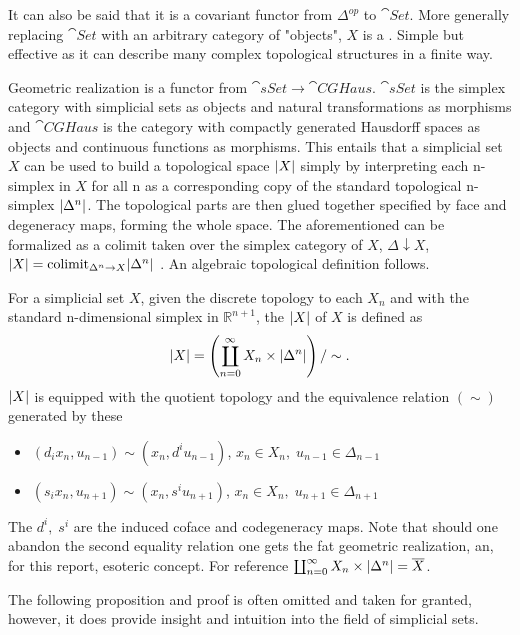 \documentclass[../../main.tex]{subfiles}
\begin{document}
    It can also be said that it is a covariant functor from $\Delta^{op}$ to $\cat{Set}$. More generally replacing $\cat{Set}$ with an arbitrary category of "objects", $X$ is a . Simple but effective as it can describe many complex topological structures in a finite way.
    
    Geometric realization is a functor from $\cat{sSet}\to \cat{CGHaus}$. $\cat{sSet}$ is the simplex category with simplicial sets as objects and natural transformations as morphisms and $\cat{CGHaus}$ is the category with compactly generated Hausdorff spaces as objects and continuous functions as morphisms. This entails that a simplicial set $X$ can be used to build a topological space $\geom[X]$ simply by interpreting each n-simplex in $X$ for all n as a corresponding copy of the standard topological n-simplex $\geom[\Delta^n]$. The topological parts are then glued together specified by face and degeneracy maps, forming the whole space. The aforementioned can be formalized as a colimit taken over the simplex category of $X$, $\Delta \downarrow X$, $\geom[X]= \text{colimit}_{\Delta^n\to X}\geom[\Delta^n]$ \cite{luk-simp}. An algebraic topological definition follows.

    \begin{definition}
        For a simplicial set $X$, given the discrete topology to each $X_n$ and with the standard n-dimensional simplex in $\mathbb{R}^{n+1}$, the  $\geom[X]$ of $X$ is defined as
        \[\geom[X]=\left(\coprod_{n=0}^{\infty} X_n \times \geom[\Delta^n]\right)/\sim.\]
        $\geom[X]$ is equipped with the quotient topology and the equivalence relation $(\sim)$ generated by these 
        \begin{itemize}
            \item $(d_ix_{n},u_{n-1})\sim(x_{n}, d^iu_{n-1})$, $x_n\in X_n,\; u_{n-1} \in \Delta _{n-1}$
            \item $(s_ix_n, u_{n+1})\sim(x_n, s^iu_{n+1})$, $x_n \in X_n,\; u_{n+1}\in \Delta_{n+1}$
        \end{itemize}
    \end{definition}
    
    The $d^i,\; s^i$ are the induced coface and codegeneracy maps. Note that should one abandon the second equality relation one gets the fat geometric realization, an, for this report, esoteric concept. For reference $\coprod_{n=0}^{\infty} X_n \times \geom[\Delta^n]= \bigGeom X$.

    The following proposition and proof is often omitted and taken for granted, however, it does provide insight and intuition into the field of simplicial sets. 
\end{document}
